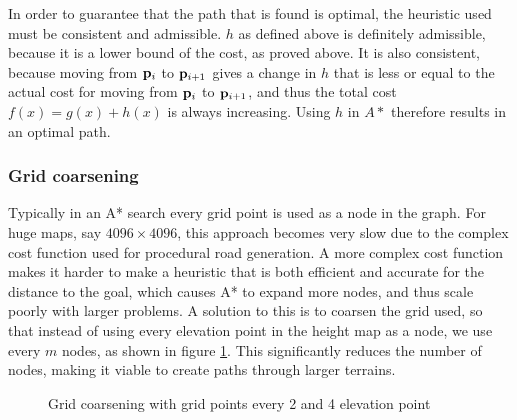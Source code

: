 In order to guarantee that the path that is found is optimal, the heuristic used must be consistent and admissible. $h$ as defined above is definitely admissible, because it is a lower bound of the cost, as proved above. It is also consistent, because moving from ${\mathbf p}_i$ to ${\mathbf p}_{i+1}$ gives a change in $h$ that is less or equal to the actual cost for moving from ${\mathbf p}_i$ to ${\mathbf p}_{i+1}$, and thus the total cost $f(x) = g(x)+h(x)$ is always increasing. Using $h$ in $A*$ therefore results in an optimal path.

\subsubsection{Grid coarsening}
Typically in an A* search every grid point is used as a node in the graph. For huge maps, say $4096\times 4096$, this approach becomes very slow due to the complex cost function used for procedural road generation. A more complex cost function makes it harder to make a heuristic that is both efficient and accurate for the distance to the goal, which causes A* to expand more nodes, and thus scale poorly with larger problems. A solution to this is to coarsen the grid used, so that instead of using every elevation point in the height map as a node, we use every $m$ nodes, as shown in figure \ref{fig:grid_coarsening}. This significantly reduces the number of nodes, making it viable to create paths through larger terrains.

\begin{figure}[ht]
\centering
{}
\qquad
{}
\caption{Grid coarsening with grid points every 2 and 4 elevation point}
\label{fig:grid_coarsening}
\end{figure}

